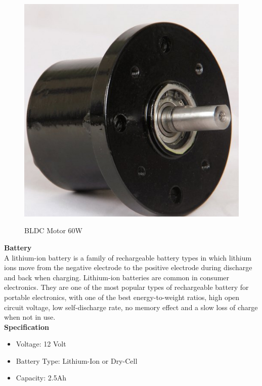 \documentclass[a4paper,12pt]{article}
\begin{document}
\begin{figure}[!h]
\centering
\includegraphics[scale=0.25]{bldc.jpg}\\
\caption{BLDC Motor 60W}
\end{figure}

\textbf{Battery}\\[1cm]
A lithium-ion battery is a family of rechargeable battery types in
which lithium ions move from the negative electrode to the positive
electrode during discharge and back when charging. Lithium-ion
batteries are common in consumer electronics. They are one of the
most popular types of rechargeable battery for portable electronics, with one of the best energy-to-weight ratios, high open circuit
voltage, low self-discharge rate, no memory effect and a slow loss of
charge when not in use.\\
\textbf{Specification}
\begin{itemize}
\item Voltage: 12 Volt
\item Battery Type: Lithium-Ion or Dry-Cell
\item Capacity: 2.5Ah
\end{itemize}
\end{document}
